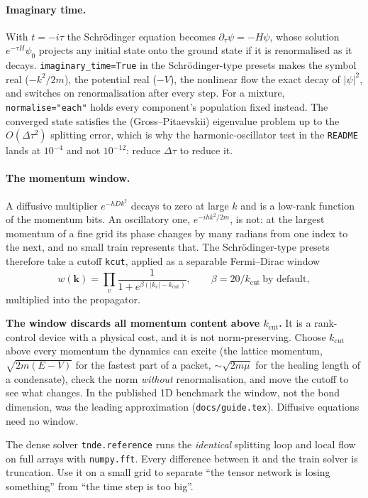 \documentclass[11pt,a4paper]{article}
\newcommand{\code}[1]{\texttt{#1}}
\newcommand{\kcut}{k_{\mathrm{cut}}}
\newcommand{\vk}{\mathbf{k}}
\begin{document}
\paragraph{Imaginary time.} With $t=-i\tau$ the Schr\"odinger equation becomes
$\partial_\tau\psi=-H\psi$, whose solution $e^{-\tau H}\psi_0$ projects any initial
state onto the ground state if it is renormalised as it decays.
\code{imaginary\_time=True} in the Schr\"odinger-type presets makes the symbol real
($-k^2/2m$), the potential real ($-V$), the nonlinear flow the exact decay of
$|\psi|^2$, and switches on renormalisation after every step. For a mixture,
\code{normalise="each"} holds every component's population fixed instead. The converged
state satisfies the (Gross--Pitaevskii) eigenvalue problem up to the $O(\Delta\tau^2)$
splitting error, which is why the harmonic-oscillator test in the \code{README} lands
at $10^{-4}$ and not $10^{-12}$: reduce $\Delta\tau$ to reduce it.

\paragraph{The momentum window.} A diffusive multiplier $e^{-hDk^2}$ decays to zero at
large $k$ and is a low-rank function of the momentum bits. An oscillatory one,
$e^{-ihk^2/2m}$, is not: at the largest momentum of a fine grid its phase changes by
many radians from one index to the next, and no small train represents that. The
Schr\"odinger-type presets therefore take a cutoff \code{kcut}, applied as a separable
Fermi--Dirac window
\begin{equation}
w(\vk)=\prod_v\frac{1}{1+e^{\beta(|k_v|-\kcut)}},
\qquad \beta=20/\kcut\ \text{by default},
\end{equation}
multiplied into the propagator.
\begin{finding}
\textbf{The window discards all momentum content above $\kcut$.} It is a rank-control
device with a physical cost, and it is not norm-preserving. Choose $\kcut$ above every
momentum the dynamics can excite (the lattice momentum, $\sqrt{2m(E-V)}$ for the
fastest part of a packet, $\sim\sqrt{2m\mu}$ for the healing length of a condensate),
check the norm \emph{without} renormalisation, and move the cutoff to see what
changes. In the published 1D benchmark the window, not the bond dimension, was the
leading approximation (\code{docs/guide.tex}). Diffusive equations need no window.
\end{finding}

The dense solver \code{tnde.reference} runs the \emph{identical} splitting loop and
local flow on full arrays with \code{numpy.fft}. Every difference between it and the
train solver is truncation. Use it on a small grid to separate ``the tensor network is
losing something'' from ``the time step is too big''.
\end{document}
